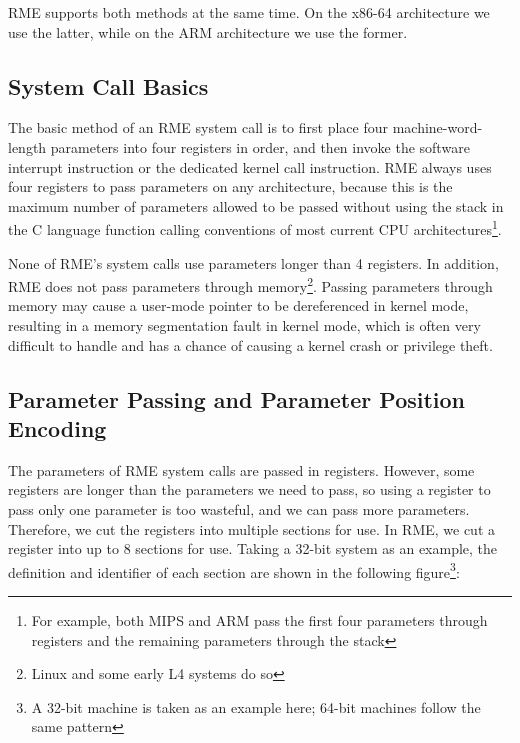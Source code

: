 RME supports both methods at the same time. On the x86-64 architecture we use the latter, while on the ARM architecture we use the former.

\subsection{System Call Basics}\label{subsec:1-system-call-basics}

The basic method of an RME system call is to first place four machine-word-length parameters into four registers in order, and then invoke the software interrupt instruction or the dedicated kernel call instruction. RME always uses four registers to pass parameters on any architecture, because this is the maximum number of parameters allowed to be passed without using the stack in the C language function calling conventions of most current CPU architectures\footnote{For example, both MIPS and ARM pass the first four parameters through registers and the remaining parameters through the stack}.

None of RME's system calls use parameters longer than 4 registers. In addition, RME does not pass parameters through memory\footnote{Linux and some early L4 systems do so}. Passing parameters through memory may cause a user-mode pointer to be dereferenced in kernel mode, resulting in a memory segmentation fault in kernel mode, which is often very difficult to handle and has a chance of causing a kernel crash or privilege theft.

\subsection{Parameter Passing and Parameter Position Encoding}\label{subsec:1-parameter-passing-and-encoding}

The parameters of RME system calls are passed in registers. However, some registers are longer than the parameters we need to pass, so using a register to pass only one parameter is too wasteful, and we can pass more parameters. Therefore, we cut the registers into multiple sections for use. In RME, we cut a register into up to 8 sections for use. Taking a 32-bit system as an example, the definition and identifier of each section are shown in the following figure\footnote{A 32-bit machine is taken as an example here; 64-bit machines follow the same pattern}:

